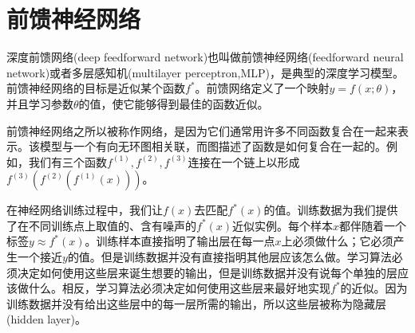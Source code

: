 \section{前馈神经网络}
深度前馈网络(deep feedforward network)也叫做前馈神经网络(feedforward neural network)或者多层感知机(multilayer perceptron,MLP)，是典型的深度学习模型。前馈神经网络的目标是近似某个函数$f^*$。前馈网络定义了一个映射$y=f(x;\theta)$，并且学习参数$\theta$的值，使它能够得到最佳的函数近似。

前馈神经网络之所以被称作网络，是因为它们通常用许多不同函数复合在一起来表示。该模型与一个有向无环图相关联，而图描述了函数是如何复合在一起的。例如，我们有三个函数$f^{(1)},f^{(2)},f^{(3)}$连接在一个链上以形成$f^{(3)}(f^{(2)}(f^{(1)}(x)))$。

在神经网络训练过程中，我们让$f(x)$去匹配$f^*(x)$的值。训练数据为我们提供了在不同训练点上取值的、含有噪声的$f^*(x)$近似实例。每个样本$x$都伴随着一个标签$y\approx f^*(x)$。训练样本直接指明了输出层在每一点$x$上必须做什么；它必须产生一个接近$y$的值。但是训练数据并没有直接指明其他层应该怎么做。学习算法必须决定如何使用这些层来诞生想要的输出，但是训练数据并没有说每个单独的层应该做什么。相反，学习算法必须决定如何使用这些层来最好地实现$f^*$的近似。因为训练数据并没有给出这些层中的每一层所需的输出，所以这些层被称为隐藏层(hidden layer)。